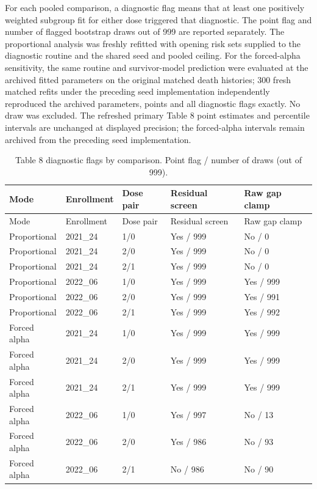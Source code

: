 \documentclass[
]{article}
\begin{document}
For each pooled comparison, a diagnostic flag means that at least one positively weighted subgroup fit for either dose triggered that diagnostic. The point flag and number of flagged bootstrap draws out of 999 are reported separately. The proportional analysis was freshly refitted with opening risk sets supplied to the diagnostic routine and the shared seed and pooled ceiling. For the forced-alpha sensitivity, the same routine and survivor-model prediction were evaluated at the archived fitted parameters on the original matched death histories; 300 fresh matched refits under the preceding seed implementation independently reproduced the archived parameters, points and all diagnostic flags exactly. No draw was excluded. The refreshed primary Table 8 point estimates and percentile intervals are unchanged at displayed precision; the forced-alpha intervals remain archived from the preceding seed implementation.

\newpage

\begin{longtable}[]{@{}lllll@{}}
\caption{Table 8 diagnostic flags by comparison. Point flag / number of draws (out of 999).}\label{tbl:si_table8_diagnostics}\tabularnewline
\toprule\noalign{}
Mode & Enrollment & Dose pair & Residual screen & Raw gap clamp \\
\midrule\noalign{}
\endfirsthead
\toprule\noalign{}
Mode & Enrollment & Dose pair & Residual screen & Raw gap clamp \\
\midrule\noalign{}
\endhead
\bottomrule\noalign{}
\endlastfoot
Proportional & 2021\_24 & 1/0 & Yes / 999 & No / 0 \\
Proportional & 2021\_24 & 2/0 & Yes / 999 & No / 0 \\
Proportional & 2021\_24 & 2/1 & Yes / 999 & No / 0 \\
Proportional & 2022\_06 & 1/0 & Yes / 999 & Yes / 999 \\
Proportional & 2022\_06 & 2/0 & Yes / 999 & Yes / 991 \\
Proportional & 2022\_06 & 2/1 & Yes / 999 & Yes / 992 \\
Forced alpha & 2021\_24 & 1/0 & Yes / 999 & Yes / 999 \\
Forced alpha & 2021\_24 & 2/0 & Yes / 999 & Yes / 999 \\
Forced alpha & 2021\_24 & 2/1 & Yes / 999 & Yes / 999 \\
Forced alpha & 2022\_06 & 1/0 & Yes / 997 & No / 13 \\
Forced alpha & 2022\_06 & 2/0 & Yes / 986 & No / 93 \\
Forced alpha & 2022\_06 & 2/1 & No / 986 & No / 90 \\
\end{longtable}
\end{document}
